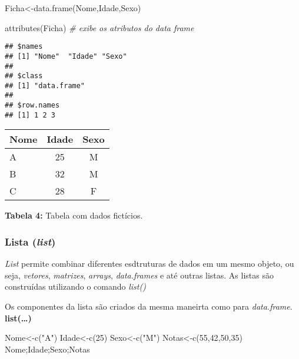 \documentclass[
]{book}
\newenvironment{Shaded}{\begin{snugshade}}{\end{snugshade}}
\newcommand{\CommentTok}[1]{\textcolor[rgb]{0.56,0.35,0.01}{\textit{#1}}}
\newcommand{\DecValTok}[1]{\textcolor[rgb]{0.00,0.00,0.81}{#1}}
\newcommand{\FunctionTok}[1]{\textcolor[rgb]{0.00,0.00,0.00}{#1}}
\newcommand{\NormalTok}[1]{#1}
\newcommand{\OtherTok}[1]{\textcolor[rgb]{0.56,0.35,0.01}{#1}}
\newcommand{\StringTok}[1]{\textcolor[rgb]{0.31,0.60,0.02}{#1}}
\begin{document}
\begin{Shaded}
\begin{Highlighting}[]
\NormalTok{Ficha}\OtherTok{\textless{}{-}}\FunctionTok{data.frame}\NormalTok{(Nome,Idade,Sexo)}

\FunctionTok{attributes}\NormalTok{(Ficha) }\CommentTok{\# exibe os atributos do data frame}
\end{Highlighting}
\end{Shaded}

\begin{verbatim}
## $names
## [1] "Nome"  "Idade" "Sexo" 
## 
## $class
## [1] "data.frame"
## 
## $row.names
## [1] 1 2 3
\end{verbatim}

\begin{tabular}{l|c|c}
\hline
Nome & Idade & Sexo\\
\hline
A & 25 & M\\
\hline
B & 32 & M\\
\hline
C & 28 & F\\
\hline
\end{tabular}

\textbf{Tabela 4:} Tabela com dados fictícios.

\hypertarget{lista-list}{%
\subsubsection{\texorpdfstring{Lista (\emph{list})}{Lista (list)}}\label{lista-list}}

\emph{List} permite combinar diferentes esdtruturas de dados em um mesmo objeto, ou seja, \emph{vetores}, \emph{matrizes}, \emph{arrays}, \emph{data.frames} e até outras listas.
As listas são construídas utilizando o comando \emph{list()}

Os componentes da lista são criados da mesma maneirta como para \emph{data.frame}.
\textbf{list(\ldots)}

\begin{Shaded}
\begin{Highlighting}[]
\NormalTok{Nome}\OtherTok{\textless{}{-}}\FunctionTok{c}\NormalTok{(}\StringTok{"A"}\NormalTok{)}
\NormalTok{Idade}\OtherTok{\textless{}{-}}\FunctionTok{c}\NormalTok{(}\DecValTok{25}\NormalTok{)}
\NormalTok{Sexo}\OtherTok{\textless{}{-}}\FunctionTok{c}\NormalTok{(}\StringTok{"M"}\NormalTok{)}
\NormalTok{Notas}\OtherTok{\textless{}{-}}\FunctionTok{c}\NormalTok{(}\DecValTok{55}\NormalTok{,}\DecValTok{42}\NormalTok{,}\DecValTok{50}\NormalTok{,}\DecValTok{35}\NormalTok{)}
\NormalTok{Nome;Idade;Sexo;Notas}
\end{Highlighting}
\end{Shaded}
\end{document}
